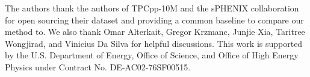 \documentclass{article}
\begin{document}
The authors thank the authors of TPCpp-10M and the sPHENIX collaboration for open sourcing their dataset and providing a common baseline to compare our method to.
We also thank Omar Alterkait, Gregor Krzmanc, Junjie Xia, Taritree Wongjirad, and Vinicius Da Silva for helpful discussions.
This work is supported by the U.S. Department of Energy, Office of Science, and Office of High Energy Physics under Contract No. DE-AC02-76SF00515.






\newpage

\end{document}
